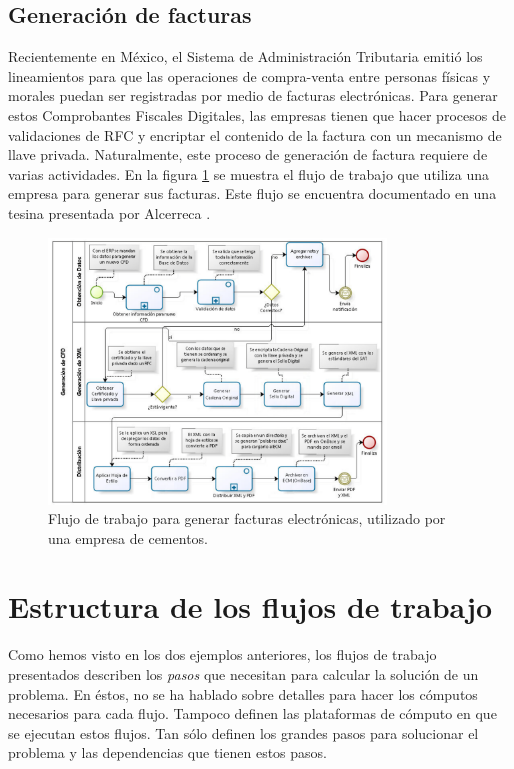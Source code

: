 \documentclass[letterpaper, 12pt]{report}
\begin{document}
\subsection{Generación de facturas}
Recientemente en México, el Sistema de Administración Tributaria emitió los lineamientos para que las operaciones de compra-venta entre personas físicas y morales puedan ser registradas por medio de facturas electrónicas. Para generar estos Comprobantes Fiscales Digitales, las empresas tienen que hacer procesos de validaciones de RFC y encriptar el contenido de la factura con un mecanismo de llave privada. Naturalmente, este proceso de generación de factura requiere de varias actividades. En la figura \ref{fig:cfd-workflow} se muestra el flujo de trabajo que utiliza una empresa para generar sus facturas. Este flujo se encuentra documentado en una tesina presentada por Alcerreca \cite{alcerreca2013cfd}.

\begin{figure}
    \begin{center}
        \includegraphics[width=0.8\textwidth]{imagenes/cfd-workflow}
    \end{center}
    \caption{Flujo de trabajo para generar facturas electrónicas, utilizado por una empresa de cementos.}
    \label{fig:cfd-workflow}
\end{figure}


\section{Estructura de los flujos de trabajo}
Como hemos visto en los dos ejemplos anteriores, los flujos de trabajo presentados describen los \emph{pasos} que necesitan para calcular la solución de un problema. En éstos, no se ha hablado sobre detalles para hacer los cómputos necesarios para cada flujo. Tampoco definen las plataformas de cómputo en que se ejecutan estos flujos. Tan sólo definen los grandes pasos para solucionar el problema y las dependencias que tienen estos pasos. 
\end{document}
